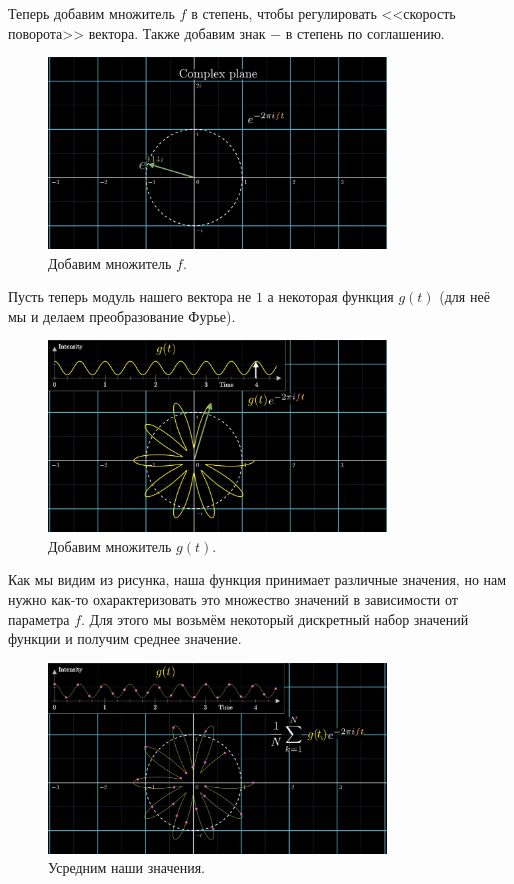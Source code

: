 Теперь добавим множитель $f$ в степень, чтобы регулировать <<скорость поворота>> вектора. Также добавим
знак $-$ в степень по соглашению.

 \begin{figure}[H]    
  \centering    
  \includegraphics[width=0.8\textwidth]{figures/dft3.png}    
  \caption*{Добавим множитель $f$.}        
\end{figure} 

Пусть теперь модуль нашего вектора не $1$ а некоторая функция $g(t)$ (для неё мы и делаем преобразование
Фурье).

\begin{figure}[H]    
  \centering    
  \includegraphics[width=0.8\textwidth]{figures/dft4.png}    
  \caption*{Добавим множитель $g(t)$.}        
\end{figure} 

Как мы видим из рисунка, наша функция принимает различные значения, но нам нужно как-то охарактеризовать 
это множество значений в зависимости от параметра $f$. Для этого мы возьмём некоторый дискретный набор
значений функции и получим среднее значение.

\begin{figure}[H]    
  \centering    
  \includegraphics[width=0.8\textwidth]{figures/dft5.png}    
  \caption*{Усредним наши значения.}        
\end{figure} 

